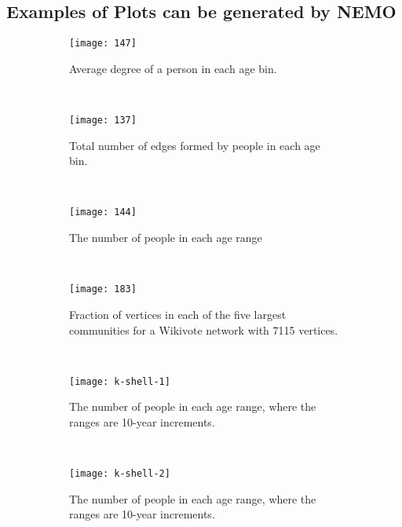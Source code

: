  \subsection{Examples of Plots can be generated by NEMO}
 
 \begin{figure}[H]
    \centering
    \begin{subfigure}[b]{0.3\textwidth}
        \texttt{[image: 147]}
        \caption{Average degree of a
person in each age bin.}
        \label{fig:147}
    \end{subfigure}
    ~ %
    \begin{subfigure}[b]{0.3\textwidth}
        \texttt{[image: 137]}
        \caption{Total number of edges
formed by people in each age bin.}
        \label{fig:137}
    \end{subfigure}
    ~ %
      \begin{subfigure}[b]{0.3\textwidth}
        \texttt{[image: 144]}
        \caption{The number of people in each age range}
        \label{fig:144}
    \end{subfigure}
     \\
     \begin{subfigure}[b]{0.3\textwidth}
        \texttt{[image: 183]}
        \caption{Fraction of vertices in each of the five largest communities
for a Wikivote network with 7115 vertices.}
        \label{fig:183}
    \end{subfigure}
    ~ 
     \begin{subfigure}[b]{0.3\textwidth}
        \texttt{[image: k-shell-1]}
        \caption{The number of people in each age range, where the
ranges are 10-year increments.}
        \label{fig:k-shell-1}
    \end{subfigure}
    ~ 
     \begin{subfigure}[b]{0.3\textwidth}
        \texttt{[image: k-shell-2]}
        \caption{The number of people in each age range, where the
ranges are 10-year increments.}
        \label{fig:k-shell-2}
    \end{subfigure}
    \\
    \begin{subfigure}[b]{0.3\textwidth}

\end{subfigure}
\end{figure}
